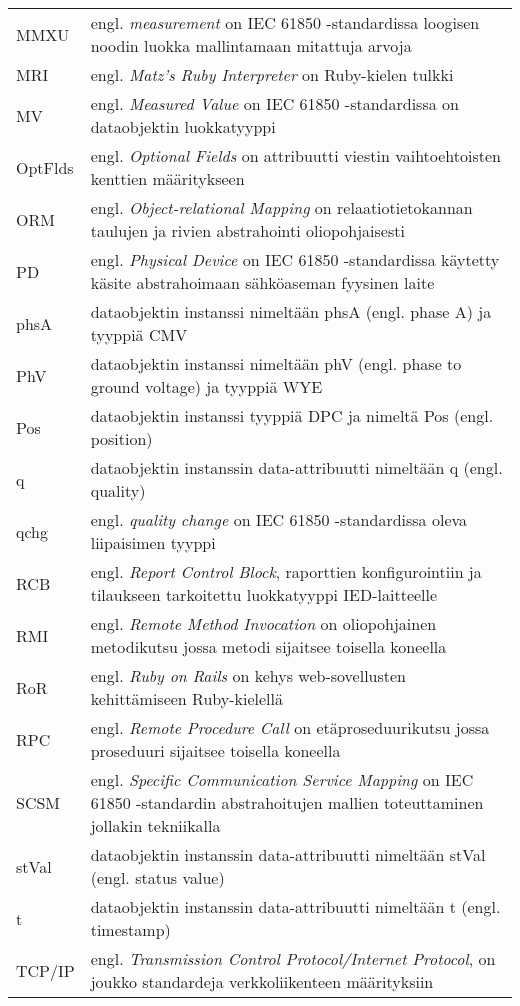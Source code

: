 \begin{tabularx}{\linewidth}[h]{@{} p{} p{} @{}}
	MMXU & engl. \emph{measurement} on IEC 61850 -standardissa loogisen noodin luokka mallintamaan mitattuja arvoja \\
	MRI & engl. \emph{Matz’s Ruby Interpreter} on Ruby-kielen tulkki \\
	MV & engl. \emph{Measured Value} on IEC 61850 -standardissa on dataobjektin luokkatyyppi \\
	OptFlds & engl. \emph{Optional Fields} on attribuutti viestin vaihtoehtoisten kenttien määritykseen \\
	ORM & engl. \emph{Object-relational Mapping} on relaatiotietokannan taulujen ja rivien abstrahointi oliopohjaisesti \\
	PD & engl. \emph{Physical Device} on IEC 61850 -standardissa käytetty käsite abstrahoimaan sähköaseman fyysinen laite \\
	phsA & dataobjektin instanssi nimeltään phsA (engl. phase A) ja tyyppiä CMV \\
	PhV & dataobjektin instanssi nimeltään phV (engl. phase to ground voltage) ja tyyppiä WYE \\
	Pos & dataobjektin instanssi tyyppiä DPC ja nimeltä Pos (engl. position) \\
	q & dataobjektin instanssin data-attribuutti nimeltään q (engl. quality) \\
	qchg & engl. \emph{quality change} on IEC 61850 -standardissa oleva liipaisimen tyyppi \\
	RCB & engl. \emph{Report Control Block}, raporttien konfigurointiin ja tilaukseen tarkoitettu luokkatyyppi IED-laitteelle \\
	RMI & engl. \emph{Remote Method Invocation} on oliopohjainen metodikutsu jossa metodi sijaitsee toisella koneella \\
	RoR & engl. \emph{Ruby on Rails} on kehys web-sovellusten kehittämiseen Ruby-kielellä \\
	RPC & engl. \emph{Remote Procedure Call} on etäproseduurikutsu jossa proseduuri sijaitsee toisella koneella \\
	SCSM & engl. \emph{Specific Communication Service Mapping} on IEC 61850 -standardin abstrahoitujen mallien toteuttaminen jollakin tekniikalla \\
	stVal & dataobjektin instanssin data-attribuutti nimeltään stVal (engl. status value) \\
	t & dataobjektin instanssin data-attribuutti nimeltään t (engl. timestamp) \\
	TCP/IP & engl. \emph{Transmission Control Protocol/Internet Protocol}, on joukko standardeja verkkoliikenteen määrityksiin \\

\end{tabularx}
